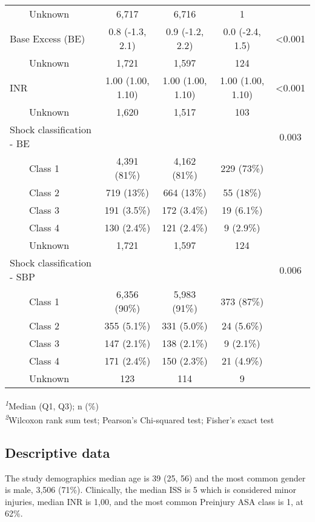 \documentclass[
]{article}
\begin{document}
\begin{table}[!t]
\begin{tabular*}{\linewidth}{@{\extracolsep{\fill}}lcccc}
    Unknown & 6,717 & 6,716 & 1 &  \\ 
Base Excess (BE) & 0.8 (-1.3, 2.1) & 0.9 (-1.2, 2.2) & 0.0 (-2.4, 1.5) & <0.001 \\ 
    Unknown & 1,721 & 1,597 & 124 &  \\ 
INR & 1.00 (1.00, 1.10) & 1.00 (1.00, 1.10) & 1.00 (1.00, 1.10) & <0.001 \\ 
    Unknown & 1,620 & 1,517 & 103 &  \\ 
Shock classification - BE &  &  &  & 0.003 \\ 
    Class 1 & 4,391 (81\%) & 4,162 (81\%) & 229 (73\%) &  \\ 
    Class 2 & 719 (13\%) & 664 (13\%) & 55 (18\%) &  \\ 
    Class 3 & 191 (3.5\%) & 172 (3.4\%) & 19 (6.1\%) &  \\ 
    Class 4 & 130 (2.4\%) & 121 (2.4\%) & 9 (2.9\%) &  \\ 
    Unknown & 1,721 & 1,597 & 124 &  \\ 
Shock classification - SBP &  &  &  & 0.006 \\ 
    Class 1 & 6,356 (90\%) & 5,983 (91\%) & 373 (87\%) &  \\ 
    Class 2 & 355 (5.1\%) & 331 (5.0\%) & 24 (5.6\%) &  \\ 
    Class 3 & 147 (2.1\%) & 138 (2.1\%) & 9 (2.1\%) &  \\ 
    Class 4 & 171 (2.4\%) & 150 (2.3\%) & 21 (4.9\%) &  \\ 
    Unknown & 123 & 114 & 9 &  \\ 
\bottomrule
\end{tabular*}
\begin{minipage}{\linewidth}
\textsuperscript{\textit{1}}Median (Q1, Q3); n (\%)\\
\textsuperscript{\textit{2}}Wilcoxon rank sum test; Pearson's Chi-squared test; Fisher's exact test\\
\end{minipage}
\end{table}

\hypertarget{descriptive-data}{%
\subsection{Descriptive data}\label{descriptive-data}}

The study demographics median age is 39 (25, 56) and the most common
gender is male, 3,506 (71\%). Clinically, the median ISS is 5 which is
considered minor injuries, median INR is 1,00, and the most common
Preinjury ASA class is 1, at 62\%.
\end{document}
